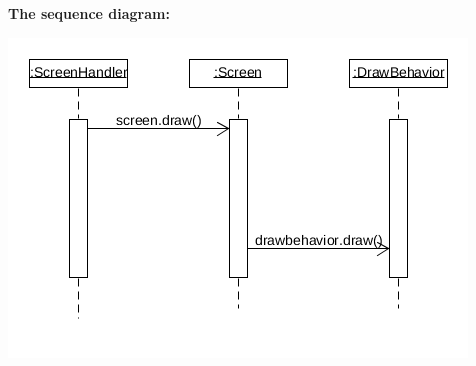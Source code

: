 \documentclass[a4paper,11pt,report]{scrartcl}
\begin{document}
\newpage\textbf{The sequence diagram:}\\
\centerline{\includegraphics[scale=1.0]{sources/StrategySequence}}
\end{document}
